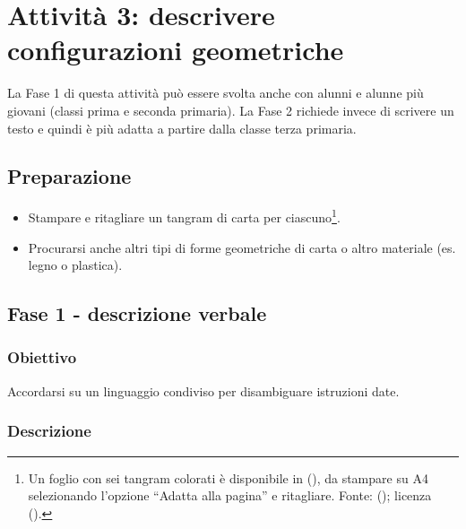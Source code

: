 \section{Attività 3: descrivere configurazioni geometriche}

La Fase 1 di questa attività può essere svolta anche con alunni e alunne più giovani (classi prima e seconda primaria). La Fase 2 richiede invece di scrivere un testo e quindi è più adatta a partire dalla classe terza primaria.

\subsection{Preparazione }\label{preparazione-1}

\begin{itemize}
\item
  Stampare e ritagliare un tangram di carta per ciascuno\footnote{Un foglio con sei tangram colorati è disponibile in
 (),
da stampare su A4 selezionando l'opzione ``Adatta alla pagina'' e ritagliare.
Fonte:  ();
licenza  ().}.
\item
  Procurarsi anche altri tipi di forme geometriche di carta o altro materiale (es. legno o plastica).
\end{itemize}

\subsection{Fase 1 - descrizione verbale }\label{fase-1---descrizione-verbale}

\ruoliattivita{\ruoloProgrammatore\quad\ruoloEsecutore}

\subsubsection{Obiettivo}

Accordarsi su un linguaggio condiviso per disambiguare istruzioni date.

\subsubsection{Descrizione}\label{descrizione}

